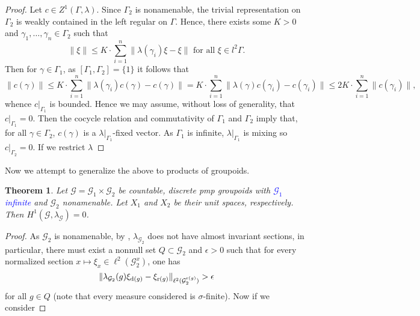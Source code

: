 \documentclass[a4paper,11pt]{article}
\numberwithin{equation}{section}
\newtheorem{thm}{Theorem}[section]
\theoremstyle{definition}
\theoremstyle{remark}
\numberwithin{equation}{section}
\newcommand{\rG}{\mathcal{G}}
\def\r{{\rm r}}
\def\d{{\rm d}}
\providecommand{\norm}[1]{\lVert#1\rVert}
\numberwithin{equation}{section}
\begin{document}
\begin{proof}
  Let $ c\in Z^{1}(\Gamma, \lambda) $. 
  Since $ \Gamma_{2} $ is nonamenable, the trivial representation on $ \Gamma_{2} $ is weakly contained in the left regular on $ \Gamma $. Hence, there exists some $ K>0 $ and $ \gamma_{1},\ldots, \gamma_{n}\in \Gamma_{2}$ such that 
  \[
    \norm{\xi} \leq K\cdot \sum_{i=1}^{n} \norm{\lambda(\gamma_{i}) \xi - \xi} \text{ for all } \xi\in l^{2} \Gamma.
  \]
  Then for $ \gamma\in \Gamma_{1} $, as $ [\Gamma_{1}, \Gamma_{2}] = \{1\} $ it follows that
  \[
    \norm{c(\gamma)} \leq K\cdot \sum_{i=1}^{n} \norm{\lambda(\gamma_{i}) c(\gamma) - c(\gamma) } = K\cdot \sum_{i=1}^{n} \norm{\lambda(\gamma) c(\gamma_{i}) - c(\gamma_{i}) } \leq 2 K \cdot \sum_{i=1}^{n} \norm{c(\gamma_{i})},
  \]
  whence $ c\vert_{\Gamma_{1}} $ is bounded. Hence we may assume, without loss of generality, that $ c\vert_{\Gamma_{1}} = 0 $. Then the cocycle relation and commutativity of $ \Gamma_{1} $ and $ \Gamma_{2} $ imply that, for all $ \gamma\in \Gamma_{2} $, $ c(\gamma) $ is a $ \lambda\vert_{\Gamma_{1}} $-fixed vector. As $ \Gamma_{1} $ is infinite, $ \lambda\vert_{\Gamma_{1}} $ is mixing so $ c\vert_{\Gamma_{2}}=0 $. If we restrict $\lambda_{}$
  
\end{proof}

Now we attempt to generalize the above to products of groupoids.




\begin{thm}
  Let $ \rG = \rG_{1}\times \rG_{2} $ be countable, discrete pmp groupoids with \textcolor{blue}{$ \rG_{1} $ infinite} and $ \rG_{2} $ nonamenable. Let $X_1$ and $X_2$ be their unit spaces, respectively. Then $ H^{1}(\rG, \lambda_\rG) = 0 $.
\end{thm}

\begin{proof}
As $\rG_2$ is nonamenable, by \cite[Theorem 6.1.4]{anatharaman:amenableGrpds}, $\lambda_{\rG_2}$ does not have almost invariant sections, in particular, there must exist a nonnull set $Q\subset \rG_2$ and $\epsilon>0$ such that for every normalized section $x\mapsto\xi_x\in \ell^2(\rG_2^x)$, one has $$
\norm{\lambda_{\rG_2}(g)\xi_{\d(g)}-\xi_{\r(g)}}_{\ell^2(\rG_2^{\r(g)})}>\epsilon
$$ for all $g\in Q$ (note that every measure considered is $\sigma$-finite). Now if we consider
\end{proof}
\end{document}
